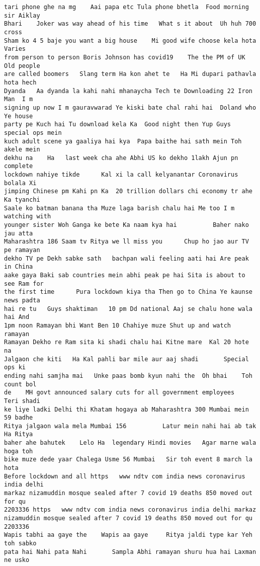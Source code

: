 \documentclass[11pt]{article}
\begin{document}
\begin{tcolorbox}[breakable, size=fbox, boxrule=.5pt, pad at break*=1mm, opacityfill=0]
\begin{Verbatim}[commandchars=\\\{\}]
tari phone ghe na mg    Aai papa etc Tula phone bhetla  Food morning sir Aiklay
Bhari    Joker was way ahead of his time   What s it about  Uh huh 700 cross
Sham ko 4 5 baje you want a big house    Mi good wife choose kela hota  Varies
from person to person Boris Johnson has covid19    The the PM of UK  Old people
are called boomers   Slang term Ha kon ahet te   Ha Mi dupari pathavla hota hech
Dyanda   Aa dyanda la kahi nahi mhanaycha Tech te Downloading 22 Iron Man  I m
signing up now I m gauravwarad Ye kiski bate chal rahi hai  Doland who  Ye house
party pe Kuch hai Tu download kela Ka  Good night then Yup Guys special ops mein
kuch adult scene ya gaaliya hai kya  Papa baithe hai sath mein Toh akele mein
dekhu na    Ha   last week cha ahe Abhi US ko dekho 1lakh Ajun pn complete
lockdown nahiye tikde      Kal xi la call kelyanantar Coronavirus bolala Xi
jimping Chinese pm Kahi pn Ka  20 trillion dollars chi economy tr ahe Ka tyanchi
Saale ko batman banana tha Muze laga barish chalu hai Me too I m watching with
younger sister Woh Ganga ke bete Ka naam kya hai          Baher nako jau atta
Maharashtra 186 Saam tv Ritya we ll miss you      Chup ho jao aur TV pe ramayan
dekho TV pe Dekh sabke sath   bachpan wali feeling aati hai Are peak in China
aake gaya Baki sab countries mein abhi peak pe hai Sita is about to see Ram for
the first time      Pura lockdown kiya tha Then go to China Ye kaunse news padta
hai re tu   Guys shaktiman   10 pm Dd national Aaj se chalu hone wala hai And
1pm noon Ramayan bhi Want Ben 10 Chahiye muze Shut up and watch ramayan
Ramayan Dekho re Ram sita ki shadi chalu hai Kitne mare  Kal 20 hote na
Jalgaon che kiti   Ha Kal pahli bar mile aur aaj shadi       Special ops ki
ending nahi samjha mai   Unke paas bomb kyun nahi the  Oh bhai    Toh count bol
de    MH govt announced salary cuts for all government employees    Teri shadi
ke liye ladki Delhi thi Khatam hogaya ab Maharashtra 300 Mumbai mein 59 badhe
Ritya jalgaon wala mela Mumbai 156          Latur mein nahi hai ab tak Ha Ritya
baher ahe bahutek    Lelo Ha  legendary Hindi movies   Agar marne wala hoga toh
bike muze dede yaar Chalega Usme 56 Mumbai   Sir toh event 8 march la hota
Before lockdown and all https   www ndtv com india news coronavirus india delhi
markaz nizamuddin mosque sealed after 7 covid 19 deaths 850 moved out for qu
2203336 https   www ndtv com india news coronavirus india delhi markaz
nizamuddin mosque sealed after 7 covid 19 deaths 850 moved out for qu 2203336
Wapis tabhi aa gaye the    Wapis aa gaye     Ritya jaldi type kar Yeh toh sabko
pata hai Nahi pata Nahi       Sampla Abhi ramayan shuru hua hai Laxman ne usko

\end{Verbatim}
\end{tcolorbox}
\end{document}
